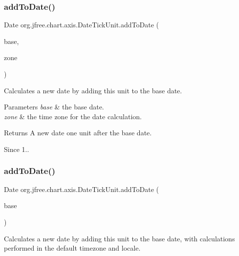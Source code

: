 \subsubsection{\texorpdfstring{add\+To\+Date()}{addToDate()}\hspace{0.1cm}{\footnotesize\ttfamily [1/2]}}
{\footnotesize\ttfamily Date org.\+jfree.\+chart.\+axis.\+Date\+Tick\+Unit.\+add\+To\+Date (\begin{DoxyParamCaption}\item[{Date}]{base,  }\item[{Time\+Zone}]{zone }\end{DoxyParamCaption})}

Calculates a new date by adding this unit to the base date.


\begin{DoxyParams}{Parameters}
{\em base} & the base date. \\
\hline
{\em zone} & the time zone for the date calculation.\\
\hline
\end{DoxyParams}
\begin{DoxyReturn}{Returns}
A new date one unit after the base date.
\end{DoxyReturn}
\begin{DoxySince}{Since}
1.. 
\end{DoxySince}
\mbox{\label{classorg_1_1jfree_1_1chart_1_1axis_1_1_date_tick_unit_a60151f4a0caa2bc774f095992580929a}} 
\subsubsection{\texorpdfstring{add\+To\+Date()}{addToDate()}\hspace{0.1cm}{\footnotesize\ttfamily [2/2]}}
{\footnotesize\ttfamily Date org.\+jfree.\+chart.\+axis.\+Date\+Tick\+Unit.\+add\+To\+Date (\begin{DoxyParamCaption}\item[{Date}]{base }\end{DoxyParamCaption})}

Calculates a new date by adding this unit to the base date, with calculations performed in the default timezone and locale.


